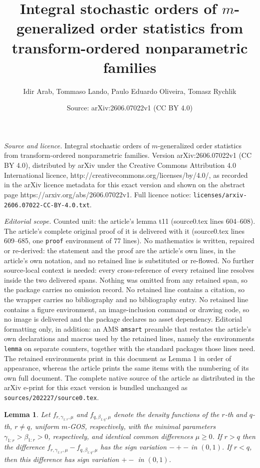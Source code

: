 \documentclass[10pt,a4paper]{amsart}
\title{Integral stochastic orders of $m$-generalized order statistics from transform-ordered nonparametric families}
\author{Idir Arab, Tommaso Lando, Paulo Eduardo Oliveira, Tomasz Rychlik}
\date{Source: arXiv:2606.07022v1 (CC BY 4.0)}
\newtheorem{lemma}{Lemma}
\newcommand{\gos}{GOS}
\begin{document}
\maketitle

\noindent\emph{Source and licence.} Integral stochastic orders of $m$-generalized order statistics from transform-ordered nonparametric families. Version arXiv:2606.07022v1 (CC BY 4.0), distributed by arXiv under the Creative Commons Attribution 4.0 International licence, http://creativecommons.org/licenses/by/4.0/, as recorded in the arXiv licence metadata for this exact version and shown on the abstract page https://arxiv.org/abs/2606.07022v1. Full licence notice: \texttt{licenses/arxiv-2606.07022-CC-BY-4.0.txt}.\par\smallskip

\noindent\textit{Editorial scope.} Counted unit: the article's lemma t11 (source0.tex lines 604--608). The article's complete original proof of it is delivered with it (source0.tex lines 609--685, one \texttt{proof} environment of 77 lines). No mathematics is written, repaired or re-derived: the statement and the proof are the article's own lines, in the article's own notation, and no retained line is substituted or re-flowed.  No further source-local context is needed: every cross-reference of every retained line resolves inside the two delivered spans.  Nothing was omitted from any retained span, so the package carries no omission record.  No retained line contains a citation, so the wrapper carries no bibliography and no bibliography entry.  No retained line contains a figure environment, an image-inclusion command or drawing code, so no image is delivered and the package declares no asset dependency.  Editorial formatting only, in addition: an AMS \texttt{amsart} preamble that restates the article's own declarations and macros used by the retained lines, namely the environments \texttt{lemma} on separate counters, together with the standard packages those lines need.  The retained environments print in this document as Lemma 1 in order of appearance, whereas the article prints the same items with the numbering of its own full document.  The complete native source of the article as distributed in the arXiv e-print for this exact version is bundled unchanged as \texttt{sources/202227/source0.tex}.
\begin{lemma}\label{t11}
Let $f_{r,\gamma_{1:r},\mu}$ and $f_{q,\beta_{1:q},\mu}$ denote the density functions of the $r$-th  and $q$-th, $r \neq q$, uniform $m$-\gos, respectively,  
with the minimal parameters $\gamma_{1:r} > \beta_{1:r}>0$, respectively, and identical common differences $\mu \geq 0$. 
If $r>q$ then the difference $f_{r,\gamma_{1:r}, \mu} - f_{q, \beta_{1:q}, \mu}$ has the sign variation $-+-$ in $(0,1)$. If $r<q$, then this difference has sign variation $+-$ in $(0,1)$.
\end{lemma} 
\end{document}
